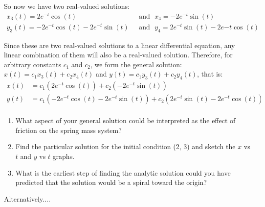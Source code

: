 So now we have two real-valued solutions:
\begin{align*}
x_3(t) = 2e^{-t}\cos(t) &\textrm{~~and~~} x_4 = -2e^{-t}\sin(t) \\
y_3(t) = -2e^{-t}\cos(t) - 2e^{-t}\sin(t) & \textrm{~~and~~} y_4 = 2e^{-t}\sin(t) - 2e{-t}\cos(t)
\end{align*}

Since these are two real-valued solutions to a linear differential equation, any linear combination of them will also be a real-valued solution.  Therefore, for arbitrary constants $c_1$ and $c_2$, we form the general solution: $x(t) = c_1 x_3(t) + c_2 x_4(t)$ and $y(t) = c_1 y_3(t) + c_2 y_4(t)$, that is:
\begin{align*}
x(t) &= c_1 (2e^{-t}\cos(t)) + c_2 (-2e^{-t}\sin(t)) \\
y(t) &= c_1 (-2e^{-t}\cos(t) -2e^{-t}\sin(t)) + c_2(2e^{-t}\sin(t) - 2e^{-t}\cos(t))\\
\end{align*}

\begin{enumerate}
\item What aspect of your general solution could be interpreted as the effect of friction on the spring mass system?
\item Find the particular solution for the initial condition (2, 3) and sketch the $x$ vs $t$ and $y$ vs $t$ graphs. 
\item What is the earliest step of finding the analytic solution could you have predicted that the solution would be a spiral toward the origin?
\end{enumerate}

\newpage
Alternatively....

